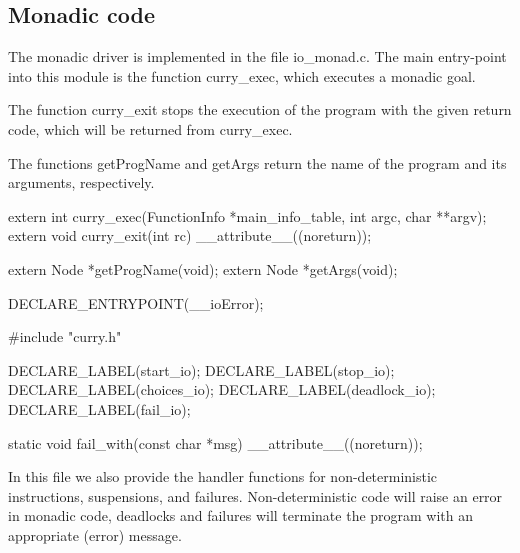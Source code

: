%
%
\subsection{Monadic code}
The monadic driver is implemented in the file {\Tt{}io{\_}monad.c\nwendquote}. The main
entry-point into this module is the function {\Tt{}curry{\_}exec\nwendquote}, which
executes a monadic goal.

The function {\Tt{}curry{\_}exit\nwendquote} stops the execution of the program with
the given return code, which will be returned from {\Tt{}curry{\_}exec\nwendquote}.

The functions {\Tt{}getProgName\nwendquote} and {\Tt{}getArgs\nwendquote} return the name of the
program and its arguments, respectively.

\nwenddocs{}\endmoddef\nwstartdeflinemarkup\nwenddeflinemarkup
extern int  curry_exec(FunctionInfo *main_info_table, int argc, char **argv);
extern void curry_exit(int rc) __attribute__((noreturn));

extern Node *getProgName(void);
extern Node *getArgs(void);

DECLARE_ENTRYPOINT(__ioError);

\nwendcode{}\nwdocspar
\nwenddocs{}\endmoddef\nwstartdeflinemarkup{}\nwenddeflinemarkup
#include "curry.h"

DECLARE_LABEL(start_io);
DECLARE_LABEL(stop_io);
DECLARE_LABEL(choices_io);
DECLARE_LABEL(deadlock_io);
DECLARE_LABEL(fail_io);

static void fail_with(const char *msg) __attribute__((noreturn));

\nwendcode{}\nwdocspar
In this file we also provide the handler functions for
non-deterministic instructions, suspensions, and failures.
Non-deterministic code will raise an error in monadic code, deadlocks
and failures will terminate the program with an appropriate (error)
message.

